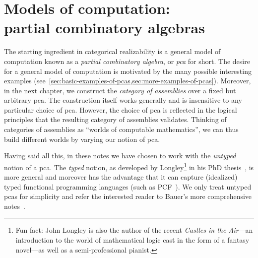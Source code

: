 \chapter[Models of computation: partial combinatory algebras]{Models of computation: \\ partial combinatory algebras}\label{chap:PCA}

The starting ingredient in categorical realizability is a general model of
computation known as a \emph{partial combinatory algebra}, or \emph{pca} for
short.
%
The desire for a general model of computation is motivated by the many possible
interesting examples
(see~\cref{sec:basic-examples-of-pcas,sec:more-examples-of-pcas}).
%
Moreover, in the next chapter, we construct the \emph{category of assemblies}
over a fixed but arbitrary pca. The construction itself works generally and is
insensitive to any particular choice of pca. However, the choice of pca is
reflected in the logical principles that the resulting category of assemblies
validates.
%
Thinking of categories of assemblies as ``worlds of computable mathematics'', we
can thus build different worlds by varying our notion of pca.

Having said all this, in these notes we have chosen to work with the
\emph{untyped} notion of a pca. The \emph{typed} notion, as developed by
Longley\footnote{Fun fact: John Longley is also the author of the recent
  \emph{Castles in the Air}---an introduction to the world of mathematical logic
  cast in the form of a fantasy novel---as well as a semi-professional
  pianist.} in his PhD thesis~\cite{Longley1995}, is more general and moreover
has the advantage that it can capture (idealized) typed functional programming
languages (such as PCF~\cite{Plotkin1977,deJong2023}).
%
We only treat untyped pcas for simplicity and refer the interested reader to
Bauer's more comprehensive notes~\cite{Bauer2023}.


